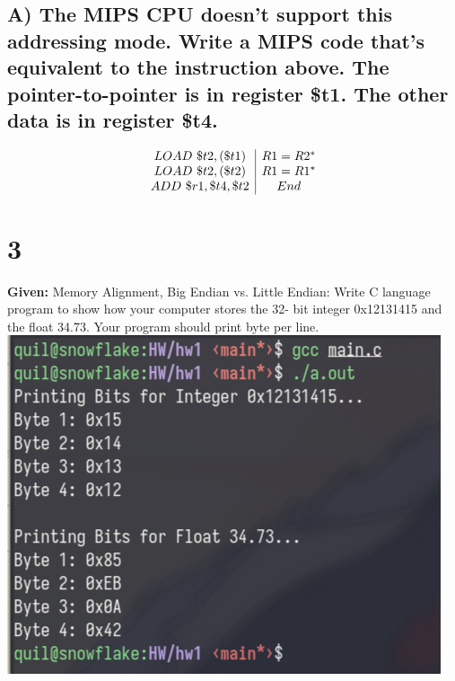 \documentclass{article}
\begin{document}
\subsection{A) The MIPS CPU doesn’t support this addressing mode. Write a MIPS code that’s equivalent to the instruction above. The pointer-to-pointer is in register \$t1. The other data is in register \$t4.}
\begin{centering}
  \begin{displaymath}
  \begin{array}{c | c}
		LOAD\ \$t2,(\$t1) & R1 = R2^* \\
		LOAD\ \$t2,(\$t2) & R1 = R1^* \\
		ADD\ \$r1,\$t4,\$t2 & End \\
  \end{array}
  \end{displaymath}
\end{centering}

\section{3}
\textbf{Given: } Memory Alignment, Big Endian vs. Little Endian: Write C language program to show how your computer stores the 32- bit integer 0x12131415 and the float 34.73. Your program should print byte per line.
\newline
\includegraphics[width=\textwidth]{evidence.png}
\newpage

\newpage
\end{document}
